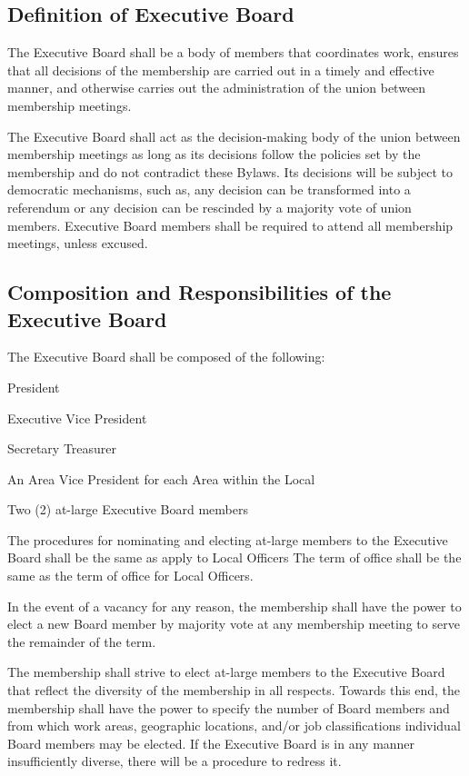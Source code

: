 \documentclass[12pt]{article}
\begin{document}
\subsection{Definition of Executive Board}
The Executive Board shall be a body of members that coordinates work, ensures that all decisions of the membership are carried out in a timely and effective manner, and otherwise carries out the administration of the union between membership meetings.

The Executive Board shall act as the decision-making body of the union between membership meetings as long as its decisions follow the policies set by the membership and do not contradict these Bylaws. Its decisions will be subject to democratic mechanisms, such as, any decision can be transformed into a referendum or any decision can be rescinded by a majority vote of union members. Executive Board members shall be required to attend all membership meetings, unless excused.

\subsection{Composition and Responsibilities of the Executive Board}
The Executive Board shall be composed of the following:

\begin{letterlist}
  \item President
  \item Executive Vice President
  \item Secretary Treasurer
  \item An Area Vice President for each Area within the Local
  \item Two (2) at-large Executive Board members
\end{letterlist}

The procedures for nominating and electing at-large members to the Executive Board shall be the same as apply to Local Officers The term of office shall be the same as the term of office for Local Officers.

In the event of a vacancy for any reason, the membership shall have the power to elect a new Board member by majority vote at any membership meeting to serve the remainder of the term.

The membership shall strive to elect at-large members to the Executive Board that reflect the diversity of the membership in all respects. Towards this end, the membership shall have the power to specify the number of Board members and from which work areas, geographic locations, and/or job classifications individual Board members may be elected. If the Executive Board is in any manner insufficiently diverse, there will be a procedure to redress it.
\end{document}
